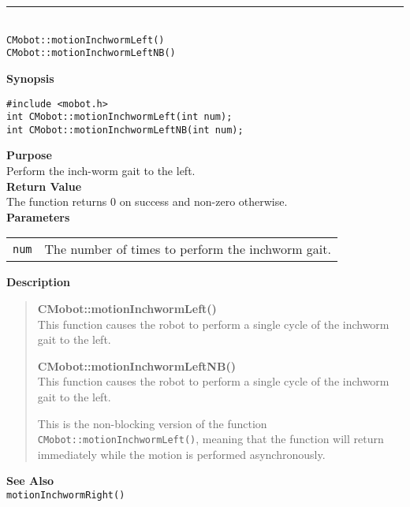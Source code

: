 \noindent
\vspace{5pt}
\rule{4.5in}{0.015in}\\
\noindent
{\LARGE \texttt{CMobot::motionInchwormLeft()}}\\
{\LARGE \texttt{CMobot::motionInchwormLeftNB()}}\\
{}

\noindent
{\bf Synopsis}
\vspace{-8pt}
\begin{verbatim}
#include <mobot.h>
int CMobot::motionInchwormLeft(int num);
int CMobot::motionInchwormLeftNB(int num);
\end{verbatim}

\noindent
{\bf Purpose}\\
Perform the inch-worm gait to the left.\\

\noindent
{\bf Return Value}\\
The function returns 0 on success and non-zero otherwise.\\

\noindent
{\bf Parameters}\\
\vspace{-0.1in}
\begin{description}
\item               
\begin{tabular}{p{15 mm}p{145 mm}}
\texttt{num} & The number of times to perform the inchworm gait.\\
\end{tabular}
\end{description}

\noindent
{\bf Description}\\
\vspace{-12pt}
\begin{quote}
{\bf CMobot::motionInchwormLeft()}\\
This function causes the robot to perform a single cycle of the inchworm gait
to the left. 

{\bf CMobot::motionInchwormLeftNB()}\\
This function causes the robot to perform a single cycle of the inchworm gait
to the left. 

This is the non-blocking version of the function \texttt{CMobot::motionInchwormLeft()},
meaning that the function will return immediately while the motion is performed
asynchronously.
\end{quote}
\noindent
{\bf See Also}\\
\texttt{motionInchwormRight()}

